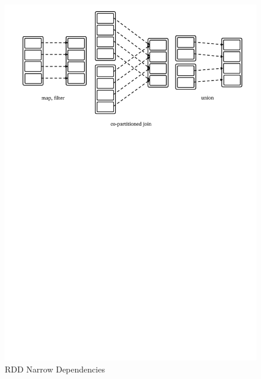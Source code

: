 \begin{figure}[H]
    \centering
    \includegraphics[clip,trim=1.5cm 19.5cm 1.1cm 0.5cm,scale=0.8]{narrow-dep.pdf}
    \caption[RDD Narrow Dependencies]{RDD Narrow Dependencies\footnotemark}
    \label{fig:sp:narrow-dep}
\end{figure}
